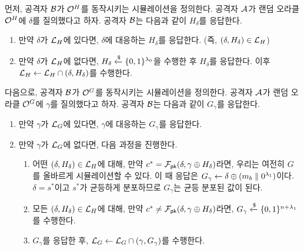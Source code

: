 
먼저, 공격자 $\mathcal{B}$가 $\mathcal{O}^{H}$를 동작시키는 시뮬레이션을 정의한다. 공격자
$\mathcal{A}$가 랜덤 오라클 $\mathcal{O}^{H}$에 $\delta$를 질의했다고 하자. 공격자 $\mathcal{B}$는
다음과 같이 $H_{\delta}$를 응답한다.
\begin{enumerate}
	\item 만약 $\delta$가 $\mathcal{L}_{H}$에 있다면, $\delta$에 대응하는 $H_\delta$를
	응답한다. (즉, $(\delta, H_{\delta}) \in \mathcal{L}_{H}$)
	\item 만약 $\delta$가 $\mathcal{L}_{H}$에 없다면, $H_{\delta} \xleftarrow{\$} \{0
	,1\}^{\lambda_0}$을 수행한 후 $H_{\delta}$를 응답한다. 이후 $\mathcal{L}_{H} \gets \mathcal{L}_{H}
	\cap (\delta, H_{\delta})$를 수행한다.
\end{enumerate}

다음으로, 공격자 $\mathcal{B}$가 $\mathcal{O}^{G}$를 동작시키는 시뮬레이션을 정의한다. 공격자
$\mathcal{A}$가 랜덤 오라클 $\mathcal{O}^{G}$에 $\gamma$를 질의했다고 하자. 공격자 $\mathcal{B}$는
다음과 같이 $G_{\gamma}$를 응답한다.
\begin{enumerate}
	\item 만약 $\gamma$가 $\mathcal{L}_{G}$에 있다면, $\gamma$에 대응하는 $G_{\gamma}$를
	응답한다.
	\item 만약 $\gamma$가 $\mathcal{L}_{G}$에 없다면, 다음 과정을 진행한다.
	\begin{enumerate}
		\item 어떤 $(\delta, H_{\delta}) \in \mathcal{L}_{H}$에 대해, 만약 $c^* =
		\mathcal{F}_{\textsf{pk}}(\delta, \gamma \oplus H_{\delta})$라면, 우리는 여전히 $G$를 올바르게
		시뮬레이션할 수 있다. 이 때 응답은 $G_{\gamma} \gets \delta \oplus (m_{b}
		\parallel 0^{\lambda_1})$이다. $\delta = s^*$이고 $s^*$가 균등하게 분포하므로
		$G_\gamma$는 균등 분포된 값이 된다. 
		\item 모든 $(\delta, H_{\delta}) \in \mathcal{L}_{H}$에 대해, 만약 $c^* \neq
		\mathcal{F}_{\textsf{pk}}(\delta, \gamma \oplus H_{\delta})$라면, $G_{\gamma} \xleftarrow{\$} \{0
		,1\}^{n + \lambda_1}$를 수행한다.
		\item $G_{\gamma}$를 응답한 후, $\mathcal{L}_{G} \gets \mathcal{L}_{G} \cap (\gamma,
		G_{\gamma})$를 수행한다.
	\end{enumerate}
\end{enumerate}

